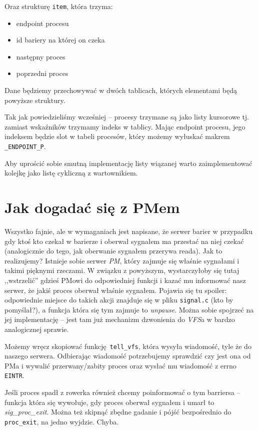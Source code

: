     Oraz strukturę \texttt{item}, która trzyma:
    \begin{itemize}
        \item endpoint procesu
        \item id bariery na której on czeka
        \item następny proces
        \item poprzedni proces
    \end{itemize}
    
    Dane będziemy przechowywać w dwóch tablicach, których elementami będą powyższe struktury.
    
    Tak jak powiedzieliśmy wcześniej -- procesy trzymane są jako listy kursorowe tj. zamiast wskaźników trzymamy indeks w tablicy. Mając endpoint procesu, jego indeksem będzie slot w tabeli procesów, który możemy wyłuskać makrem \texttt{\_ENDPOINT\_P}.
    
    Aby uprościć sobie smutną implementację listy wiązanej warto zaimplementować kolejkę jako listę cykliczną z wartownikiem.

\section {Jak dogadać się z PMem}
Wszystko fajnie, ale w wymaganiach jest napisane, że serwer barier w przypadku gdy ktoś kto czekał w barierze i oberwał sygnałem ma przestać na niej czekać (analogicznie do tego, jak oberwanie sygnałem przerywa reada). Jak to realizujemy? Istnieje sobie serwer \textit{PM}, który zajmuje się właśnie sygnałami i takimi pięknymi rzeczami. W związku z powyższym, wystarczyłoby się tutaj ,,wstrzelić'' gdzieś PMowi do odpowiedniej funkcji i kazać mu informować nasz serwer, że jakiś proces oberwał właśnie sygnałem. Pojawia się tu spoiler: odpowiednie miejsce do takich akcji znajduje się w pliku \texttt{signal.c} (kto by pomyślał?), a funkcja która się tym zajmuje to \textit{unpause}. Można sobie spojrzeć na jej implementację -- jest tam już mechanizm dzwonienia do \textit{VFS}a w bardzo analogicznej sprawie.

Możemy wręcz skopiować funkcję \texttt{tell\_vfs}, która wysyła wiadomość, tyle że do naszego serwera.
Odbierając wiadomość potrzebujemy sprawdzić czy jest ona od PMa i wywalić przerwany/zabity proces oraz wysłać mu wiadomość z errno \texttt{EINTR}.

Jeśli proces spadł z rowerka również chcemy poinformować o tym barriersa -- funkcja która się wywołuje, gdy proces oberwał sygnałem i umarł to \textit{sig\_proc\_exit}. 
Można też skipnąć zbędne gadanie i pójść bezpośrednio do \texttt{proc\_exit}, na jedno wyjdzie. Chyba.


